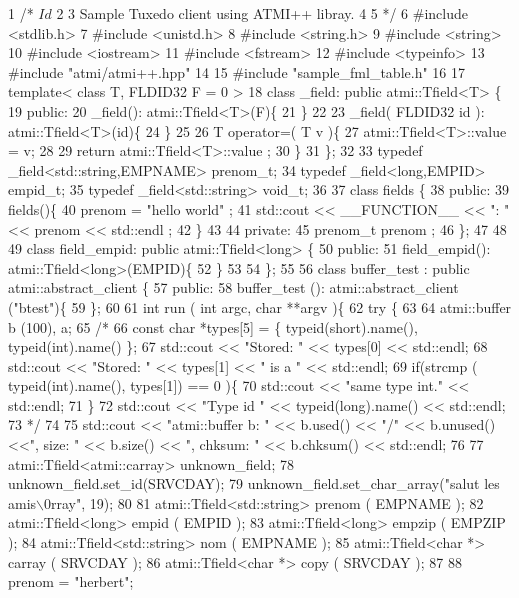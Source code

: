 \begin{DoxyCodeInclude}
1 /* $Id$
2 
3    Sample Tuxedo client using ATMI++ libray.
4 
5  */
6 #include <stdlib.h>
7 #include <unistd.h>
8 #include <string.h>
9 #include <string>
10 #include <iostream>
11 #include <fstream>
12 #include <typeinfo>
13 #include "atmi/atmi++.hpp"
14 
15 #include "sample\_fml\_table.h"
16 
17 template< class T, FLDID32 F = 0 >
18 class \_field: public atmi::Tfield<T> \{
19   public:
20     \_field(): atmi::Tfield<T>(F)\{
21     \}
22 
23     \_field( FLDID32 id ): atmi::Tfield<T>(id)\{
24     \}
25 
26     T operator=( T v )\{
27       atmi::Tfield<T>::value = v;
28 
29       return atmi::Tfield<T>::value ;
30     \}
31 \};
32 
33 typedef \_field<std::string,EMPNAME> prenom\_t;
34 typedef \_field<long,EMPID>   empid\_t;
35 typedef \_field<std::string>  void\_t;
36 
37 class fields \{
38   public:
39     fields()\{
40       prenom = "hello world" ;
41       std::cout << \_\_FUNCTION\_\_ << ": " << prenom << std::endl ;
42     \}
43 
44   private:
45     prenom\_t prenom ;
46 \};
47 
48 
49 class field\_empid: public atmi::Tfield<long> \{
50   public:
51     field\_empid(): atmi::Tfield<long>(EMPID)\{
52     \}
53 
54 \};
55 
56 class buffer\_test : public atmi::abstract\_client \{
57   public:
58     buffer\_test (): atmi::abstract\_client ("btest")\{
59     \};
60 
61     int run ( int argc, char **argv )\{
62       try \{
63 
64         atmi::buffer b (100), a;
65         /*
66            const char *types[5] = \{ typeid(short).name(), typeid(int).name() \};
67            std::cout << "Stored: " << types[0] << std::endl;
68            std::cout << "Stored: " << types[1] << " is a " << std::endl;
69            if(strcmp ( typeid(int).name(), types[1]) == 0 )\{
70            std::cout << "same type int." << std::endl;
71            \}
72            std::cout << "Type id " << typeid(long).name() << std::endl;
73          */
74 
75         std::cout << "atmi::buffer b: " << b.used() << "/" << b.unused() <<", size: " << b.size() << ",
       chksum: " << b.chksum() <<  std::endl;
76 
77         atmi::Tfield<atmi::carray>   unknown\_field;
78         unknown\_field.set\_id(SRVCDAY);
79         unknown\_field.set\_char\_array("salut les amis\(\backslash\)0rray", 19);
80 
81         atmi::Tfield<std::string> prenom ( EMPNAME );
82         atmi::Tfield<long>   empid ( EMPID );
83         atmi::Tfield<long>   empzip ( EMPZIP );
84         atmi::Tfield<std::string> nom ( EMPNAME );
85         atmi::Tfield<char *> carray ( SRVCDAY );
86         atmi::Tfield<char *> copy ( SRVCDAY );
87 
88         prenom = "herbert";

\end{DoxyCodeInclude}

